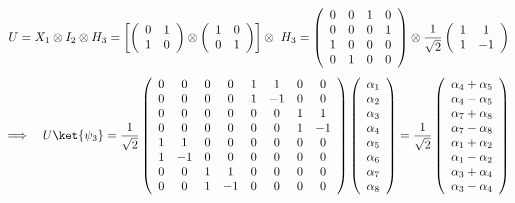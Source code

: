 \documentclass[11pt,a4paper,twoside,pdf]{article}
\numberwithin{equation}{section}
\begin{document}
				\begin{equation} \label{eq: Ejemplo Puertas} \notag
					U = X_1 \otimes I_2 \otimes H_3 = \left[\left(\begin{array}{cc}
					0 & 1\\
					1 & 0
					\end{array}\right)\otimes\left(\begin{array}{cc}
					1 & 0\\
					0 & 1
					\end{array}\right)\right]\otimes\ H_3
					=\left(\begin{array}{cccc}
					0 & 0 & 1 & 0\\
					0 & 0 & 0 & 1\\
					1 & 0 & 0 & 0\\
					0 & 1 & 0 & 0
					\end{array}\right)\otimes\frac{1}{\sqrt{2}}\left(\begin{array}{cc}
					1 & 1\\
					1 & -1
					\end{array}\right)
				\end{equation}
				\begin{equation} \notag
					\Longrightarrow \quad
					U \ket{\psi_3} = \frac{1}{\sqrt{2}}\left(\begin{array}{cccccccc}
					0 & 0 & 0 & 0 & 1 & 1 & 0 & 0\\
					0 & 0 & 0 & 0 & 1 & -1 & 0 & 0\\
					0 & 0 & 0 & 0 & 0 & 0 & 1 & 1\\
					0 & 0 & 0 & 0 & 0 & 0 & 1 & -1\\
					1 & 1 & 0 & 0 & 0 & 0 & 0 & 0\\
					1 & -1 & 0 & 0 & 0 & 0 & 0 & 0\\
					0 & 0 & 1 & 1 & 0 & 0 & 0 & 0\\
					0 & 0 & 1 & -1 & 0 & 0 & 0 & 0
					\end{array}\right)
					\left(\begin{array}{c}
					\alpha_{1}\\
					\alpha_{2}\\
					\alpha_{3}\\
					\alpha_{4}\\
					\alpha_{5}\\
					\alpha_{6}\\
					\alpha_{7}\\
					\alpha_{8}
					\end{array}\right) =
					\frac{1}{\sqrt{2}} \left(\begin{array}{c}
					\alpha_{4}+\alpha_{5}\\
					\alpha_{4}-\alpha_{5}\\
					\alpha_{7}+\alpha_{8}\\
					\alpha_{7}-\alpha_{8}\\
					\alpha_{1}+\alpha_{2}\\
					\alpha_{1}-\alpha_{2}\\
					\alpha_{3}+\alpha_{4}\\
					\alpha_{3}-\alpha_{4}
					\end{array}\right)
				\end{equation}
			
\end{document}

